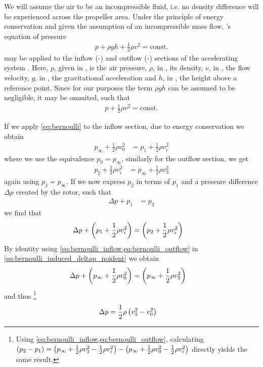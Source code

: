 We will assume the air to be an incompressible fluid, i.e. no density difference will be experienced across the propeller area. 
Under the principle of energy conservation and given the assumption of an incompressible mass flow, 's equation of pressure
%
\begin{align}
p + \rho g h + \frac{1}{2}\rho v^2 = \text{const.}
\end{align}
%
may be applied to the inflow (-) and outflow (-) sections of the accelerating system \cite{seddon2002}.
Here, $p$, given in \withunit{\newton\per\square\metre}, is the air pressure, 
$\rho$, in \withunit{\kilo\gram\per\cubic\metre}, its density,
$v$, in \withunit{\metre\per\second}, the flow velocity,
$g$, in , the gravitational acceleration and
$h$, in \withunit{\metre}, the height above a reference point.
%
%
Since for our purposes the term $\rho g h$ can be assumed to be negligible, it may be ommited, such that
%
\begin{align}
p + \frac{1}{2} \rho v^2 = \text{const.} \label{eq:bernoulli}
\end{align}

If we apply \cref{eq:bernoulli} to the inflow section, due to energy conservation we obtain
%
\begin{align}
p_\infty + \frac{1}{2} \rho v^2_0 &= p_1 + \frac{1}{2} \rho v^2_i \label{eq:bernoulli_inflow}
\end{align}
%
where we use the equivalence $p_0 = p_\infty$, similarly for the outflow section, we get
%
\begin{align}
p_2 + \frac{1}{2} \rho v^2_i &= p_\infty + \frac{1}{2} \rho v^2_3 \label{eq:bernoulli_outflow}
\end{align}
%
again using $p_3 = p_\infty$.
If we now express $p_2$ in terms of $p_1$ and a pressure difference $\Delta p$ created by the rotor, such that
\begin{align}
\Delta p + p_1 &= p_2
\end{align}
%
we find that
%
\begin{align}
\Delta p + \left( p_1 + \frac{1}{2} \rho v^2_i \right) &= \left(  p_2 + \frac{1}{2} \rho v^2_i \right) \label{eq:bernoulli_induced_deltap_noident}
\end{align}
%
By identity using \cref{eq:bernoulli_inflow,eq:bernoulli_outflow} in \cref{eq:bernoulli_induced_deltap_noident} we obtain
%
\begin{align}
\Delta p + \left( p_\infty + \frac{1}{2} \rho v^2_0 \right) &= \left( p_\infty + \frac{1}{2} \rho v^2_3 \right) \label{eq:bernoulli_induced_deltap}
\end{align}
%
and thus%
\footnote{Using \cref{eq:bernoulli_inflow,eq:bernoulli_outflow}, calculating
$\left( p_2 - p_1 \right) = \left(p_\infty + \frac{1}{2} \rho v^2_3 - \frac{1}{2} \rho v^2_i\right) - \left( p_\infty + \frac{1}{2} \rho v^2_0 - \frac{1}{2} \rho v^2_i\right)$ directly yields the same result.
}
%
\begin{align}
\Delta p &= \frac{1}{2} \rho \left( v^2_3 - v^2_0 \right) \label{eq:pressure_difference_v3}
\end{align}

